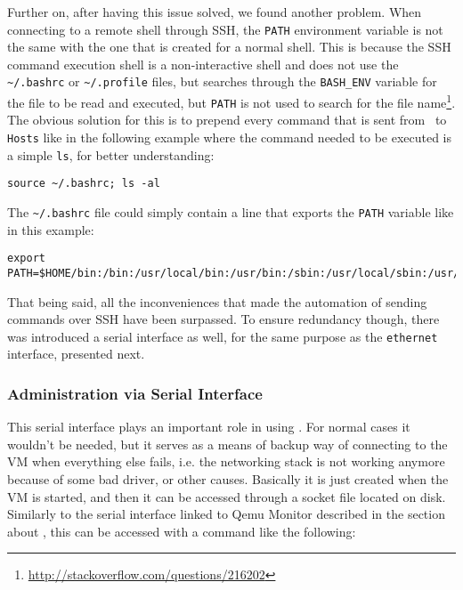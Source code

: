 Further on, after having this issue solved, we found another problem.
When connecting to a remote shell through SSH, the \texttt{PATH} environment variable is not the same with the one that is created for a normal shell.
This is because the SSH command execution shell is a non-interactive shell and does not use the \texttt{\textasciitilde/.bashrc} or \texttt{\textasciitilde/.profile} files, but searches through the \texttt{BASH_ENV} variable for the file to be read and executed, but \texttt{PATH} is not used to search for the file name\footnote{\url{http://stackoverflow.com/questions/216202}}.
The obvious solution for this is to prepend every command that is sent from \project\ to \texttt{Hosts} like in the following example where the command needed to be executed is a simple \texttt{ls}, for better understanding:

\lstset{label=lst:ssh-prepend-example}
\begin{lstlisting}
source ~/.bashrc; ls -al
\end{lstlisting}

The \texttt{\textasciitilde/.bashrc} file could simply contain a line that exports the \texttt{PATH} variable like in this example:

\lstset{label=lst:ssh-bashrc-example}
\begin{lstlisting}
export PATH=$HOME/bin:/bin:/usr/local/bin:/usr/bin:/sbin:/usr/local/sbin:/usr/sbin
\end{lstlisting}

That being said, all the inconveniences that made the automation of sending commands over SSH have been surpassed.
To ensure redundancy though, there was introduced a serial interface as well, for the same purpose as the \texttt{ethernet} interface, presented next.

\subsubsection{Administration via Serial Interface}
\label{sub-sub-sec:admin-serial}

This serial interface plays an important role in using \project.
For normal cases it wouldn't be needed, but it serves as a means of backup way of connecting to the VM when everything else fails, i.e. the networking stack is not working anymore because of some bad driver, or other causes.
Basically it is just created when the VM is started, and then it can be accessed through a socket file located on disk.
Similarly to the serial interface linked to Qemu Monitor described in the section about , this can be accessed with a command like the following:

